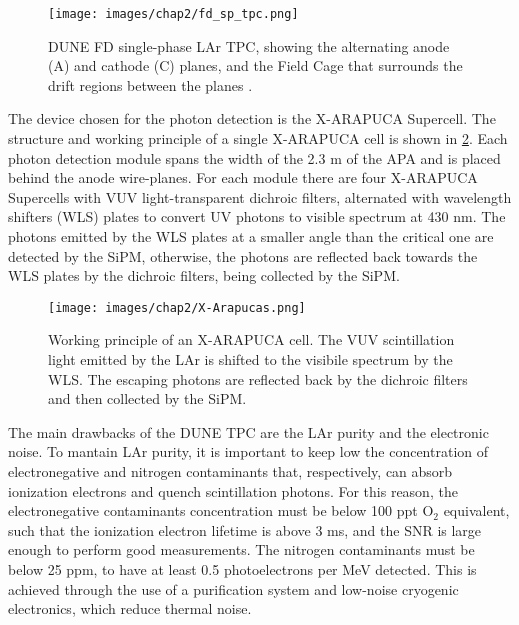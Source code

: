 \begin{figure}[h!]
    \centering
    \texttt{[image: images/chap2/fd\_sp\_tpc.png]}
    \caption{DUNE FD single-phase LAr TPC, showing the alternating anode (A) and cathode (C) planes, and the Field Cage that surrounds the drift regions between the planes \cite{fd_tdr_vol1}.}
    \label{fig:sp_tpc}
\end{figure}

\noindent The device chosen for the photon detection is the X-ARAPUCA Supercell. The structure and working principle of a single X-ARAPUCA cell is shown in \ref{fig:X-Arap}. Each photon detection module spans the width of the 2.3 m of the APA and is placed behind the anode wire-planes. For each module there are four X-ARAPUCA Supercells with VUV light-transparent dichroic filters, alternated with wavelength shifters (WLS) plates to convert UV photons to visible spectrum at 430 nm. The photons emitted by the WLS plates at a smaller angle than the critical one are detected by the SiPM, otherwise, the photons are reflected back towards the WLS plates by the dichroic filters, being collected by the SiPM.

\begin{figure}[h!]
    \centering
    \texttt{[image: images/chap2/X-Arapucas.png]}
    \caption{Working principle of an X-ARAPUCA cell. The VUV scintillation light emitted by the LAr is shifted to the visibile spectrum by the WLS. The escaping photons are reflected back by the dichroic filters and then collected by the SiPM.}
    \label{fig:X-Arap}
\end{figure}

The main drawbacks of the DUNE TPC are the LAr purity and the electronic noise. To mantain LAr purity, it is important to keep low the concentration of electronegative and nitrogen contaminants that, respectively, can absorb ionization electrons and quench scintillation photons. For this reason, the electronegative contaminants concentration must be below 100 ppt $\text{O}_2$ equivalent, such that the ionization electron lifetime is above 3 ms, and the SNR is large enough to perform good measurements. The nitrogen contaminants must be below 25 ppm, to have at least 0.5 photoelectrons per MeV detected. This is achieved through the use of a purification system and low-noise cryogenic electronics, which reduce thermal noise.

